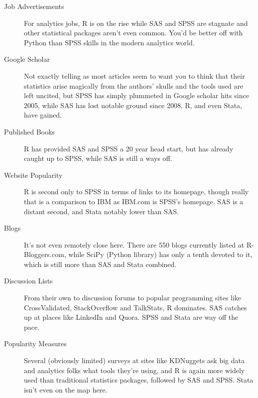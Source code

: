\documentclass[english,nohyper,titlepage]{tufte-handout}\usepackage[]{graphicx}\usepackage[]{color}
\begin{document}
\begin{description}
  \item[Job Advertisements] For analytics jobs, R is on the rise while SAS and SPSS are stagnate and other statistical packages aren't even common. You'd be better off with Python than SPSS skills in the modern analytics world.
  \item[Google Scholar] Not exactly telling as most articles seem to want you to think that their statistics arise magically from the authors' skulls and the tools used are left uncited, but SPSS has simply plummeted in Google scholar hits since 2005, while SAS has lost notable ground since 2008. R, and even  Stata, have gained.
  \item[Published Books]  R has provided SAS and SPSS a 20 year head start, but has already caught up to SPSS, while SAS is still a ways off.  
  \item[Website Popularity] R is second only to SPSS in terms of links to its homepage, though really that is a comparison to IBM as IBM.com is SPSS's homepage.  SAS is a distant second, and Stata notably lower than SAS.
  \item[Blogs]  It's not even remotely close here.  There are 550 blogs currently listed at R-Bloggers.com, while SciPy (Python library) has only a tenth devoted to it, which is still more than SAS and Stata combined.  
  \item[Discussion Lists] From their own to discussion forums to popular programming sites like CrossValidated, StackOverflow and TalkStats, R dominates. SAS catches up at places like LinkedIn and Quora.  SPSS and Stata are way off the pace.
  \item[Popularity Measures] Several (obviously limited) surveys at sites like KDNuggets ask big data and analytics folks what tools they're using, and R is again more widely used than traditional statistics packages, followed by SAS and SPSS.  Stata isn't even on the map here.  
\end{description}
\end{document}
